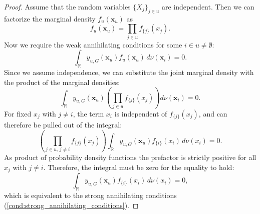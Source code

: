 \begin{proof}
Assume that the random variables $\{X_j\}_{j \in u}$ are independent. Then we can factorize the marginal density $f_u(\boldsymbol{x}_u)$ as
\[
f_u(\boldsymbol{x}_u) = \prod_{j \in u} f_{\{j\}}(x_j).
\]
Now we require the weak annihilating conditions for some $i \in u \neq \emptyset$:
\[
\int_{\mathbb{R}} y_{u,G}(\boldsymbol{x}_u) f_u(\boldsymbol{x}_u) \, d \nu(\boldsymbol{x}_i) = 0.
\]
Since we assume independence, we can substitute the joint marginal density with the product of the marginal densities:
\[
\int_{\mathbb{R}} y_{u,G}(\boldsymbol{x}_u) \left( \prod_{j \in u} f_{{\{j\}}}(x_j) \right) d \nu(\boldsymbol{x}_i) = 0.
\]
For fixed $x_j$ with $j \ne i$, the term $x_i$ is independent of $f_{{\{j\}}}(x_j)$, and can therefore be pulled out of the integral:
\[
\left( \prod_{j \in u,\, j \ne i} f_{{\{j\}}}(x_j) \right) \int_{\mathbb{R}} y_{u,G}(\boldsymbol{x}_u) f_{{\{i\}}}(x_i) \, d \nu(x_i) = 0.
\]
As product of probability density functions the prefactor is strictly positive for all $x_j$ with $j \ne i$. Therefore, the integral must be zero for the equality to hold:
\[
\int_{\mathbb{R}} y_{u,G}(\boldsymbol{x}_u) f_{{\{i\}}}(x_i) \, d \nu(x_i) = 0,
\]
which is equivalent to the strong annihilating conditions (\autoref{cond:strong_annihilating_conditions}).
\end{proof}



